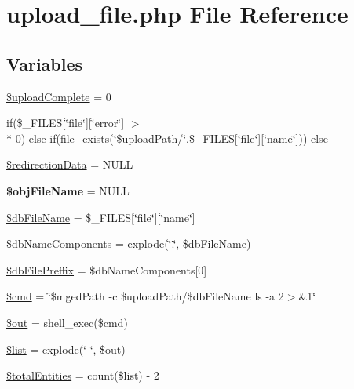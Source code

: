 \hypertarget{upload__file_8php}{\section{upload\-\_\-file.\-php File Reference}
\label{upload__file_8php}
}
\subsection*{Variables}
\begin{DoxyCompactItemize}
\item 
\hyperlink{upload__file_8php_a1f7d071bedb8673aa713baddd14e2ed1}{\$upload\-Complete} = 0
\item 
if(\$\-\_\-\-F\-I\-L\-E\-S\mbox{[}\char`\"{}file\char`\"{}\mbox{]}\mbox{[}\char`\"{}error\char`\"{}\mbox{]} $>$\\*
 0) else if(file\-\_\-exists(\char`\"{}\$upload\-Path/\char`\"{}.\$\-\_\-\-F\-I\-L\-E\-S\mbox{[}\char`\"{}file\char`\"{}\mbox{]}\mbox{[}\char`\"{}name\char`\"{}\mbox{]})) \hyperlink{upload__file_8php_a8991bab36794a3fd6413c85da0a3516b}{else}
\item 
\hyperlink{upload__file_8php_a4bfc4abb42c1a5571cc275eb8dc0de4c}{\$redirection\-Data} = N\-U\-L\-L
\item 
\hypertarget{upload__file_8php_a2e269ed8ee1613666988c90aa19c6a59}{{\bfseries \$obj\-File\-Name} = N\-U\-L\-L}\label{upload__file_8php_a2e269ed8ee1613666988c90aa19c6a59}

\item 
\hyperlink{upload__file_8php_ab20da318c11da52be7a0bd751aa80ba2}{\$db\-File\-Name} = \$\-\_\-\-F\-I\-L\-E\-S\mbox{[}\char`\"{}file\char`\"{}\mbox{]}\mbox{[}\char`\"{}name\char`\"{}\mbox{]}
\item 
\hyperlink{upload__file_8php_a82064fc59286d59cc519da100ff37a03}{\$db\-Name\-Components} = explode(\char`\"{}.\char`\"{}, \$db\-File\-Name)
\item 
\hyperlink{upload__file_8php_ad2ec2b4b4d7f2f14d90fa0a87387c143}{\$db\-File\-Preffix} = \$db\-Name\-Components\mbox{[}0\mbox{]}
\item 
\hyperlink{upload__file_8php_a9c87033fa49b61f753e3c263da5edeab}{\$cmd} = \char`\"{}\$mged\-Path -\/c \$upload\-Path/\$db\-File\-Name ls -\/a 2$>$\&1\char`\"{}
\item 
\hyperlink{upload__file_8php_a48cb304902320d173a4eaa41543327b9}{\$out} = shell\-\_\-exec(\$cmd)
\item 
\hyperlink{upload__file_8php_a358b00350db3d8f227d500337cc437af}{\$list} = explode(\char`\"{} \char`\"{}, \$out)
\item 
\hyperlink{upload__file_8php_a4176312f6451cbbe1bd9d40253527e1d}{\$total\-Entities} = count(\$list) -\/ 2
\end{DoxyCompactItemize}


